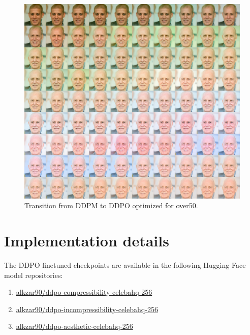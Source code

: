 \begin{appendixs}
        \begin{figure}
            \centering
            \includegraphics[scale=2.80]{img/results/over50_46.png}
            \vspace{-0pt}  %
            \captionsetup{width=\textwidth} %
            \caption{Transition from DDPM to DDPO optimized for over50.}
            \label{fig:ddpm-to-ddpo-over50-extra2}
        \end{figure}


    \newpage

    \section{Implementation details}\label{appendix:implementation}

    The DDPO finetuned checkpoints are available in the following Hugging Face
    model repositories: 
    \begin{enumerate}
        \item \href{https://huggingface.co/alkzar90/ddpo-compressibility-celebahq-256}{alkzar90/ddpo-compressibility-celebahq-256}
        \item \href{https://huggingface.co/alkzar90/ddpo-incompressibility-celebahq-256}{alkzar90/ddpo-incompressibility-celebahq-256}
        \item \href{https://huggingface.co/alkzar90/ddpo-aesthetic-celebahq-256}{alkzar90/ddpo-aesthetic-celebahq-256}
    \end{enumerate}


\end{appendixs}

